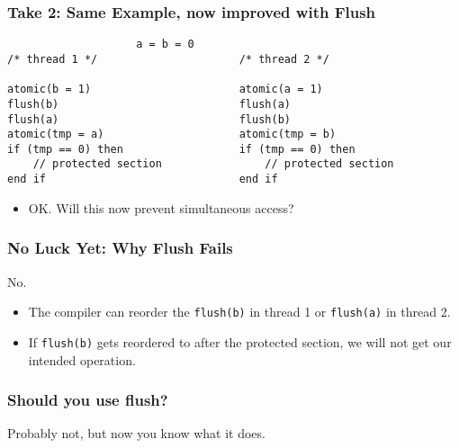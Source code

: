 \documentclass[aspectratio=43]{beamer}
\newenvironment{changemargin}[1]{%
  \begin{list}{}{%
    \setlength{\topsep}{0pt}%
    \setlength{\leftmargin}{#1}%
    \setlength{\rightmargin}{1em}
    \setlength{\listparindent}{\parindent}%
    \setlength{\itemindent}{\parindent}%
    \setlength{\parsep}{\parskip}%
  }%
  \item[]}{\end{list}}
\begin{document}
\begin{frame}[fragile]
  \frametitle{Take 2: Same Example, now improved with Flush}

  \begin{lstlisting}
                    a = b = 0
/* thread 1 */                      /* thread 2 */

atomic(b = 1)                       atomic(a = 1)
flush(b)                            flush(a)
flush(a)                            flush(b)
atomic(tmp = a)                     atomic(tmp = b)
if (tmp == 0) then                  if (tmp == 0) then
    // protected section                // protected section
end if                              end if
  \end{lstlisting}

  \begin{itemize}
    \item OK. Will this now prevent simultaneous access?
  \end{itemize}
\end{frame}

\begin{frame}[fragile]
  \frametitle{No Luck Yet: Why Flush Fails}

  \begin{changemargin}{1.5cm}

  \begin{center}
    \alert{\LARGE No.}
  \end{center}

  \begin{itemize}
    \item The compiler can reorder the {\tt flush(b)} in thread 1 or
      {\tt flush(a)} in thread 2.

    \item If {\tt flush(b)} gets reordered to after the protected
      section, we will not get our intended operation.
  \end{itemize}
  \end{changemargin}
\end{frame}

\begin{frame}[fragile]
  \frametitle{Should you use flush?}

  \begin{changemargin}{1.5cm}
  \Large
  Probably not, but now you know what it does.
  \end{changemargin}

\end{frame}
\end{document}

